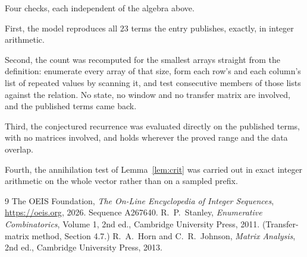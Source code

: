 \documentclass[11pt,a4paper]{article}
\theoremstyle{plain}
\theoremstyle{definition}
\begin{document}
Four checks, each independent of the algebra above.

First, the model reproduces all $23$ terms the entry publishes, exactly, in integer
arithmetic.

Second, the count was recomputed for the smallest arrays straight from the definition:
enumerate every array of that size, form each row's and each column's list of repeated values
by scanning it, and test consecutive members of those lists against the relation. No state, no
window and no transfer matrix are involved, and the published terms came back.

Third, the conjectured recurrence was evaluated directly on the published terms, with no
matrices involved, and holds wherever the proved range and the data overlap.

Fourth, the annihilation test of Lemma~\ref{lem:crit} was carried out in exact integer
arithmetic on the whole vector rather than on a sampled prefix.

\begin{thebibliography}{9}
 The OEIS Foundation, \emph{The On-Line Encyclopedia of Integer
Sequences}, \url{https://oeis.org}, 2026. Sequence A267640.
 R.~P.~Stanley, \emph{Enumerative Combinatorics}, Volume 1, 2nd ed.,
Cambridge University Press, 2011. (Transfer-matrix method, Section 4.7.)
 R.~A.~Horn and C.~R.~Johnson, \emph{Matrix Analysis}, 2nd ed., Cambridge
University Press, 2013.
\end{thebibliography}
\end{document}
